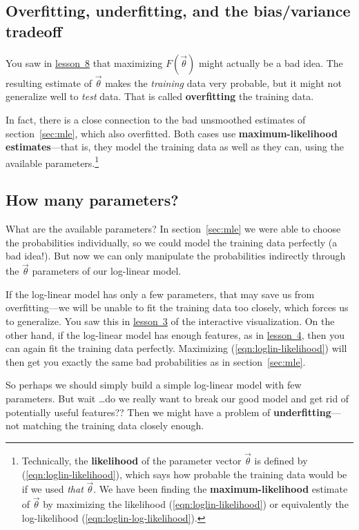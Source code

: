 \documentclass[11pt]{article}
\newcommand{\vtheta}{\vec{\theta}}
\newcommand{\lesson}[1]{\href{http://cs.jhu.edu/~jason/tutorials/loglin/\##1}{lesson~#1}}
\begin{document}
\subsection{Overfitting, underfitting, and the bias/variance tradeoff}

You saw in \lesson{8} that maximizing $F(\vtheta)$ might actually be a
bad idea.  The resulting estimate of $\vtheta$ makes the {\em
  training} data very probable, but it might not generalize well to
{\em test} data.  That is called {\bf overfitting} the training data.

In fact, there is a close connection to the bad unsmoothed estimates
of section~\ref{sec:mle}, which also overfitted.  Both cases use {\bf
  maximum-likelihood estimates}---that is, they model the training
data as well as they can, using the available
parameters.\footnote{Technically, the {\bf likelihood} of the
  parameter vector $\vtheta$ is defined by
  (\ref{eqn:loglin-likelihood}), which says how probable the training
  data would be if we used {\em that} $\vtheta$.  We have been finding
  the {\bf maximum-likelihood} estimate of $\vtheta$ by maximizing the
  likelihood (\ref{eqn:loglin-likelihood}) or equivalently the
  log-likelihood (\ref{eqn:loglin-log-likelihood}).}

\subsection{How many parameters?}

What are the available parameters?  In section~\ref{sec:mle} we were
able to choose the probabilities individually, so we could model the
training data perfectly (a bad idea!).  But now we can only manipulate
the probabilities indirectly through the $\vtheta$ parameters of our
log-linear model.

If the log-linear model has only a few parameters, that may save us
from overfitting---we will be unable to fit the training data too
closely, which forces us to generalize.  You saw this in \lesson{3} of
the interactive visualization.  On the other hand, if the log-linear
model has enough features, as in \lesson{4}, then you can again fit the
training data perfectly.  Maximizing (\ref{eqn:loglin-likelihood})
will then get you exactly the same bad probabilities as in
section~\ref{sec:mle}.

So perhaps we should simply build a simple log-linear model with few
parameters.  But wait \ldots do we really want to break our good model
and get rid of potentially useful features??  Then we might have a
problem of {\bf underfitting}---not matching the training data closely
enough.
\end{document}
